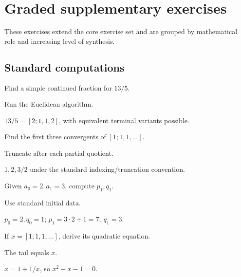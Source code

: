\section{Graded supplementary exercises}
These exercises extend the core exercise set and are grouped by mathematical role and increasing level of synthesis.

\subsection*{Standard computations}

\begin{exercise}\label{exr:ii25-expand-01}
Find a simple continued fraction for \(13/5\).
\end{exercise}
\begin{hint}
Run the Euclidean algorithm.
\end{hint}
\begin{solution}
\(13/5=[2;1,1,2]\), with equivalent terminal variants possible.
\end{solution}

\begin{exercise}\label{exr:ii25-expand-02}
Find the first three convergents of \([1;1,1,\ldots]\).
\end{exercise}
\begin{hint}
Truncate after each partial quotient.
\end{hint}
\begin{solution}
\(1,2,3/2\) under the standard indexing/truncation convention.
\end{solution}

\begin{exercise}[Recurrence]\label{exr:ii25-expand-03}
Given \(a_0=2,a_1=3\), compute \(p_1,q_1\).
\end{exercise}
\begin{hint}
Use standard initial data.
\end{hint}
\begin{solution}
\(p_0=2,q_0=1\); \(p_1=3\cdot2+1=7,\ q_1=3\).
\end{solution}

\begin{exercise}\label{exr:ii25-expand-04}
If \(x=[1;1,1,\ldots]\), derive its quadratic equation.
\end{exercise}
\begin{hint}
The tail equals \(x\).
\end{hint}
\begin{solution}
\(x=1+1/x\), so \(x^2-x-1=0\).
\end{solution}

